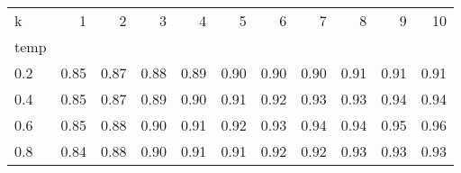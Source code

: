 \begin{tabular}{lrrrrrrrrrr}
\toprule
k & 1 & 2 & 3 & 4 & 5 & 6 & 7 & 8 & 9 & 10 \\
temp &  &  &  &  &  &  &  &  &  &  \\
\midrule
0.2 & 0.85 & 0.87 & 0.88 & 0.89 & 0.90 & 0.90 & 0.90 & 0.91 & 0.91 & 0.91 \\
0.4 & 0.85 & 0.87 & 0.89 & 0.90 & 0.91 & 0.92 & 0.93 & 0.93 & 0.94 & 0.94 \\
0.6 & 0.85 & 0.88 & 0.90 & 0.91 & 0.92 & 0.93 & 0.94 & 0.94 & 0.95 & 0.96 \\
0.8 & 0.84 & 0.88 & 0.90 & 0.91 & 0.91 & 0.92 & 0.92 & 0.93 & 0.93 & 0.93 \\
\bottomrule
\end{tabular}
